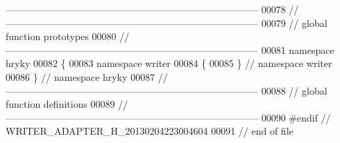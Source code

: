 \begin{DoxyCode}
{      ------------------------------------------------------------------------------}
00078 \textcolor{comment}{//
      ------------------------------------------------------------------------------}
00079 \textcolor{comment}{// global function prototypes}
00080 \textcolor{comment}{//
      ------------------------------------------------------------------------------}
00081 \textcolor{keyword}{namespace }hryky
00082 \{
00083 \textcolor{keyword}{namespace }writer
00084 \{
00085 \} \textcolor{comment}{// namespace writer}
00086 \} \textcolor{comment}{// namespace hryky}
00087 \textcolor{comment}{//
      ------------------------------------------------------------------------------}
00088 \textcolor{comment}{// global function definitions}
00089 \textcolor{comment}{//
      ------------------------------------------------------------------------------}
00090 \textcolor{preprocessor}{#endif // WRITER\_ADAPTER\_H\_20130204223004604}
00091 \textcolor{preprocessor}{}\textcolor{comment}{// end of file}
\end{DoxyCode}
